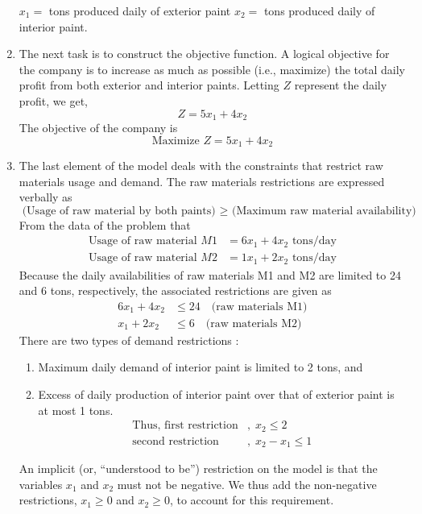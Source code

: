 \documentclass[../main-sheet.tex]{subfiles}
\begin{document}
\begin{ex}
\begin{enumerate}[label=Step \arabic*:]
              \(x_1=\) tons produced daily of exterior paint
              \(x_2=\) tons produced daily of interior paint.
        \item The next task is to construct the objective function. A logical objective for the company is to increase as much as possible (i.e., maximize) the total daily profit from both exterior and interior paints. Letting \(Z\) represent the daily profit, we get,
              \[
                  Z = 5x_1 +4x_2
              \]
              The objective of the company is
              \[
                  \text{Maximize } Z = 5x_1 +4x_2
              \]
        \item The last element of the model deals with the constraints that restrict raw materials usage and demand. The raw materials restrictions are expressed verbally as
              \[
                  \text{(Usage of raw material by both paints) } \geq \text{ (Maximum raw material availability)}
              \]
              From the data of the problem that
              \begin{align*}
                  \text{Usage of raw material }M1 & = 6x_1 +4x_2 \text{ tons/day} \\
                  \text{Usage of raw material }M2 & = 1x_1 +2x_2 \text{ tons/day}
              \end{align*}
              Because the daily availabilities of raw materials M1 and M2 are limited to 24 and 6 tons,
              respectively, the associated restrictions are given as
              \begin{align*}
                  6x_1 +4x_2 & \leq 24\quad \text{(raw materials M1)} \\
                  x_1 + 2x_2 & \leq 6\quad \text{(raw materials M2)}
              \end{align*}
              There are two types of demand restrictions :
              \begin{enumerate}
                  \item Maximum daily demand of interior paint is limited to 2 tons, and
                  \item  Excess of daily production of interior paint over that of exterior paint is at most 1 tons.
                        \begin{align*}
                            \text{Thus, first restriction} & ,\; x_2 \leq 2      \\
                            \text{second restriction}      & ,\;x_2 - x_1 \leq 1
                        \end{align*}
              \end{enumerate}
              An implicit (or, ``understood to be'') restriction on the model is that the variables \(x_1\) and \(x_2\) must not be negative. We thus add the non-negative restrictions, \(x_1\geq 0\)  and \(x_2 \geq 0\), to account for this requirement.\\



\end{enumerate}
\end{ex}
\end{document}
